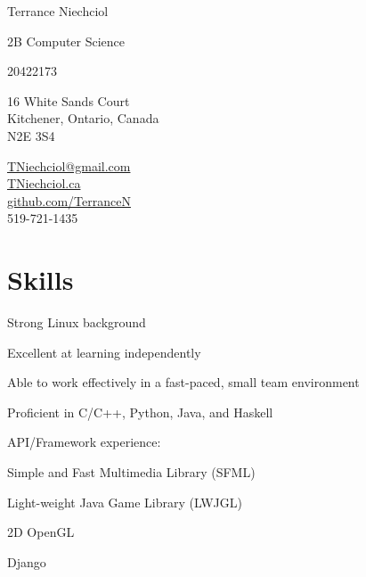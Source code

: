 \documentclass[10pt,letterpaper]{article}
\begin{document}
\begin{center}
{\Huge Terrance Niechciol}

2B Computer Science

20422173
\end{center}

\begin{minipage}[t]{0.5\textwidth}
\begin{center}
16 White Sands Court\\
Kitchener, Ontario, Canada\\
N2E 3S4\\
\end{center}
\end{minipage} %
\begin{minipage}[t]{0.5\textwidth}
\begin{center}
\href{mailto:TNiechciol@gmail.com}{TNiechciol@gmail.com}\\
\href{http://TNiechciol.ca}{TNiechciol.ca}\\
\href{https://github.com/TerranceN}{github.com/TerranceN}\\
519-721-1435\\
\end{center}
\end{minipage}

\section*{Skills}
    \begin{description}
        \item Strong Linux background
        \item Excellent at learning independently
        \item Able to work effectively in a fast-paced, small team environment
        \item Proficient in C/C++, Python, Java, and Haskell
        \item API/Framework experience:
        \begin{description}
            \item Simple and Fast Multimedia Library (SFML)
            \item Light-weight Java Game Library (LWJGL)
            \item 2D OpenGL
            \item Django
        \end{description}
    \end{description}
\end{document}
